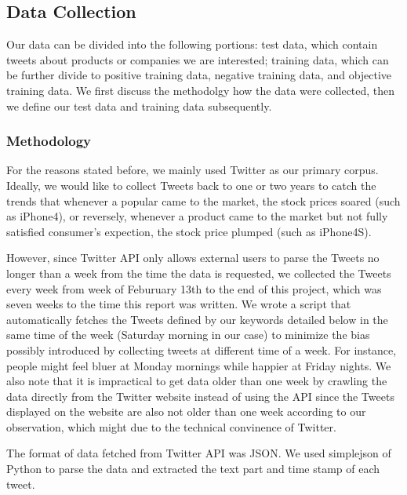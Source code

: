 \documentclass[12pt]{article}
\begin{document}
\subsection{Data Collection}\label{data-collection}
Our data can be divided into the following portions: test data, which contain tweets about products or companies we are interested; training data, which can be further divide to positive training data, negative training data, and objective training data. We first discuss the methodolgy how the data were collected, then we define our test data and training data subsequently.

\subsubsection{Methodology}
For the reasons stated before, we mainly used Twitter as our primary corpus. Ideally, we would like to collect Tweets back to one or two years to catch the trends that whenever a popular came to the market, the stock prices soared (such as iPhone4), or reversely, whenever a product came to the market but not fully satisfied consumer's expection, the stock price plumped (such as iPhone4S). 

However, since Twitter API only allows external users to parse the Tweets no longer than a week from the time the data is requested, we collected the Tweets every week from week of Feburuary 13th to the end of this project, which was seven weeks to the time this report was written. We wrote a script that automatically fetches the Tweets defined by our keywords detailed below in the same time of the week (Saturday morning in our case) to minimize the bias possibly introduced by collecting tweets at different time of a week. For instance, people might feel bluer at Monday mornings while happier at Friday nights. We also note that it is impractical to get data older than one week by crawling the data directly from the Twitter website instead of using the API since the Tweets displayed on the website are also not older than one week according to our observation, which might due to the technical convinence of Twitter.

The format of data fetched from Twitter API was JSON. We used simplejson of Python to parse the data and extracted the text part and time stamp of each tweet.
\end{document}
